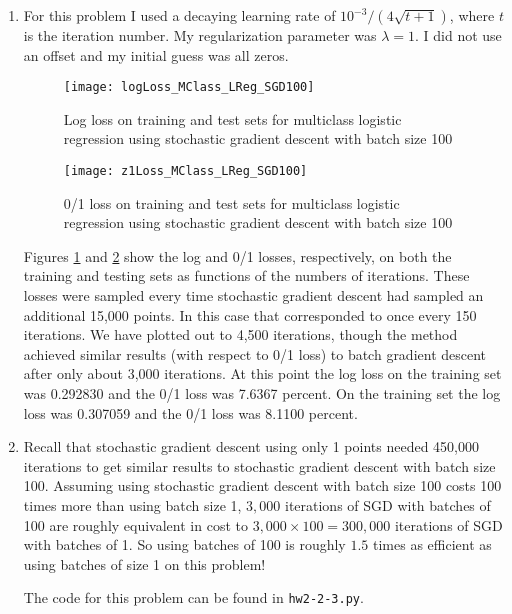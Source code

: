 \documentclass{article}
\begin{document}
\begin{enumerate}
	\item For this problem I used a decaying learning rate of $10^{-3} / (4\sqrt{t+1})$, where $t$ is the iteration number. My regularization parameter was $\lambda =1$. I did not use an offset and my initial guess was all zeros.

	\begin{figure}
        \centering
        \texttt{[image: logLoss\_MClass\_LReg\_SGD100]}
        \caption{Log loss on training and test sets for multiclass logistic regression using stochastic gradient descent with batch size 100} 
        \label{fig:2.3.2log}
    \end{figure}
    \begin{figure}
        \centering
        \texttt{[image: z1Loss\_MClass\_LReg\_SGD100]}
        \caption{0/1 loss on training and test sets for multiclass logistic regression using stochastic gradient descent with batch size 100} 
        \label{fig:2.3.2z1}
    \end{figure}

    Figures \ref{fig:2.3.2log} and \ref{fig:2.3.2z1} show the log and 0/1 losses, respectively, on both the training and testing sets as functions of the numbers of iterations. These losses were sampled every time stochastic gradient descent had sampled an additional 15,000 points. In this case that corresponded to once every 150 iterations. We have plotted out to 4,500 iterations, though the method achieved similar results (with respect to 0/1 loss) to batch gradient descent after only about 3,000 iterations. At this point the log loss on the training set was 0.292830 and the 0/1 loss was 7.6367 percent. On the training set the log loss was 0.307059 and the 0/1 loss was 8.1100 percent.

    \item Recall that stochastic gradient descent using only 1 points needed 450,000 iterations to get similar results to stochastic gradient descent with batch size 100. Assuming using stochastic gradient descent with batch size 100 costs 100 times more than using batch size 1, $3,000$ iterations of SGD with batches of 100 are roughly equivalent in cost to $3,000\times 100 = 300,000$ iterations of SGD with batches of 1. So using batches of 100 is roughly $1.5$ times as efficient as using batches of size 1 on this problem!

    The code for this problem can be found in \texttt{hw2-2-3.py}.

\end{enumerate}
\end{document}
